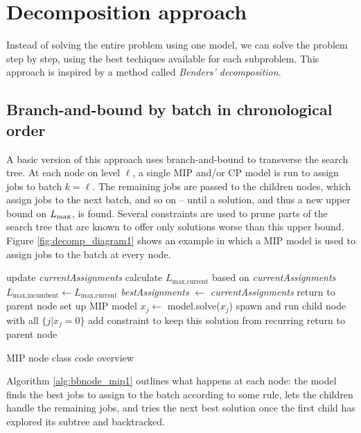 \section{Decomposition approach}

Instead of solving the entire problem using one model, we can solve the problem
step by step, using the best techiques available for each subproblem. This
approach is inspired by a method called \textit{Benders' decomposition}.

\subsection{Branch-and-bound by batch in chronological order}
A basic version of this approach uses branch-and-bound to transverse the search
tree. At each node on level $\ell$, a single MIP and/or CP model is run to
assign jobs to batch $k = \ell$. The remaining jobs are passed to the children
nodes, which assign jobs to the next batch, and so on -- until a solution, and
thus a new upper bound on $L_{\text{max}}$, is found. Several constraints are used to
prune parts of the search tree that are known to offer only solutions worse than
this upper bound. Figure \ref{fig:decomp_diagram1} shows an example in which a
MIP model is used to assign jobs to the batch at every node.
\begin{algorithm}[h]
\fontsize{9pt}{11.5pt}\selectfont
\begin{algorithmic}
\State update \textit{currentAssignments} 
 
  \State calculate $L_{\text{max,current}}$ based on \textit{currentAssignments}
    \State $L_{\text{max,incumbent}} \gets L_{\text{max,current}}$
    \State \textit{bestAssignments} $\gets$ \textit{currentAssignments}
  \EndIf
  \State return to parent node
\EndIf
\State set up MIP model 
\Repeat
  \State $x_j \gets$ model.solve($x_j$) 
  \State spawn and run child node with all $\{j | x_j = 0\}$ 
  \State add constraint to keep this solution from recurring 
\State return to parent node
\end{algorithmic}
\caption{MIP node class code overview}
\label{alg:bbnode_mip1}
\end{algorithm}
Algorithm \ref{alg:bbnode_mip1} outlines what happens at each node: the model
finds the best jobs to assign to the batch according to some rule, lets the
children handle the remaining jobs, and tries the next best solution once the
first child has explored its subtree and backtracked.
